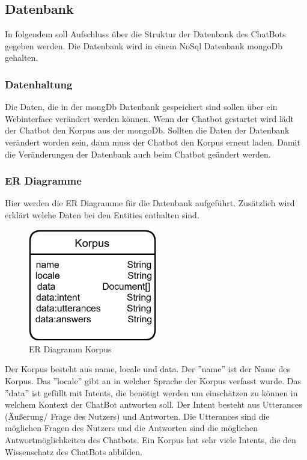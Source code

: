 \newpage
\subsection{Datenbank}
In folgendem soll Aufschluss über die Struktur der Datenbank des ChatBots gegeben werden.
Die Datenbank wird in einem NoSql Datenbank mongoDb gehalten.

\subsubsection{Datenhaltung}
Die Daten, die in der mongDb Datenbank gespeichert sind sollen über ein Webinterface verändert werden können.
Wenn der Chatbot gestartet wird lädt der Chatbot den Korpus aus der mongoDb.
Sollten die Daten der Datenbank verändert worden sein, dann muss der Chatbot den Korpus erneut laden.
Damit die Veränderungen der Datenbank auch beim Chatbot geändert werden.

\subsubsection{ER Diagramme}
Hier werden die ER Diagramme für die Datenbank aufgeführt.
Zusätzlich wird erklärt welche Daten bei den Entities enthalten sind.

\begin{figure}[H]
    \centering
    \includegraphics[width=0.5\textwidth]{bilder/technologien/ERMDiagram.png}
    \caption{ER Diagramm Korpus}
    \label{fig:ER_Diagramm_Korpus}
\end{figure}

\noindent Der Korpus besteht aus name, locale und data. 
Der ''name'' ist der Name des Korpus. 
Das ''locale'' gibt an in welcher Sprache der Korpus verfasst wurde. 
Das ''data'' ist gefüllt mit Intents, die benötigt werden um einschätzen zu können in welchem Kontext der ChatBot antworten soll. 
Der Intent besteht aus Utterances (Äußerung/ Frage des Nutzers) und Antworten. 
Die Utterances sind die möglichen Fragen des Nutzers und die Antworten sind die möglichen Antwortmöglichkeiten des Chatbots. 
Ein Korpus hat sehr viele Intents, die den Wissenschatz des ChatBots abbilden. 

